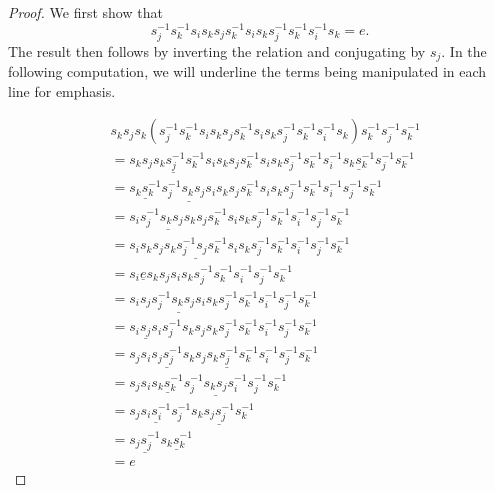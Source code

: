 \documentclass[11pt]{amsart}
\theoremstyle{definition}
\begin{document}
\begin{proof}
We first show that
$$s_{j}^{-1}s_{k}^{-1}s_{i}s_{k}s_{j}s_{k}^{-1}s_{i}s_{k}s_{j}^{-1}s_{k}^{-1}s_{i}^{-1}s_{k} = e.$$
The result then follows by inverting the relation and conjugating by $s_{j}$. In the following computation, we will underline the terms being manipulated in each line for emphasis.

\begin{align*}
& s_{k}s_{j}s_{k}(s_{j}^{-1}s_{k}^{-1}s_{i}s_{k}s_{j}s_{k}^{-1}s_{i}s_{k}s_{j}^{-1}s_{k}^{-1}s_{i}^{-1}s_{k})s_{k}^{-1}s_{j}^{-1}s_{k}^{-1} \\
&= s_{k}\underline{s_{j}s_{k}s_{j}^{-1}s_{k}^{-1}}s_{i}s_{k}s_{j}s_{k}^{-1}s_{i}s_{k}s_{j}^{-1}s_{k}^{-1}s_{i}^{-1}\underline{s_{k}s_{k}^{-1}}s_{j}^{-1}s_{k}^{-1} \\
&= \underline{s_{k}s_{k}^{-1}}\underline{s_{j}^{-1}s_{k}s_{j}s_{i}}s_{k}s_{j}s_{k}^{-1}s_{i}s_{k}s_{j}^{-1}s_{k}^{-1}s_{i}^{-1}s_{j}^{-1}s_{k}^{-1} \\
&= s_{i}\underline{s_{j}^{-1}s_{k}s_{j}s_{k}}s_{j}s_{k}^{-1}s_{i}s_{k}s_{j}^{-1}s_{k}^{-1}s_{i}^{-1}s_{j}^{-1}s_{k}^{-1} \\
&= s_{i}s_{k}s_{j}\underline{s_{k}s_{j}^{-1}s_{j}s_{k}^{-1}}s_{i}s_{k}s_{j}^{-1}s_{k}^{-1}s_{i}^{-1}s_{j}^{-1}s_{k}^{-1} \\
&= s_{i}\underline{e}s_{k}s_{j}s_{i}s_{k}s_{j}^{-1}s_{k}^{-1}s_{i}^{-1}s_{j}^{-1}s_{k}^{-1} \\
&= s_{i}s_{j}\underline{s_{j}^{-1}s_{k}s_{j}s_{i}}s_{k}s_{j}^{-1}s_{k}^{-1}s_{i}^{-1}s_{j}^{-1}s_{k}^{-1} \\
&= \underline{s_{i}s_{j}s_{i}}s_{j}^{-1}s_{k}s_{j}s_{k}s_{j}^{-1}s_{k}^{-1}s_{i}^{-1}s_{j}^{-1}s_{k}^{-1} \\
&= s_{j}s_{i}\underline{s_{j}s_{j}^{-1}}s_{k}\underline{s_{j}s_{k}s_{j}^{-1}s_{k}^{-1}}s_{i}^{-1}s_{j}^{-1}s_{k}^{-1} \\
&= s_{j}s_{i}\underline{s_{k}s_{k}^{-1}}\underline{s_{j}^{-1}s_{k}s_{j}s_{i}^{-1}}s_{j}^{-1}s_{k}^{-1} \\
&= s_{j}\underline{s_{i}s_{i}^{-1}}s_{j}^{-1}s_{k}\underline{s_{j}s_{j}^{-1}}s_{k}^{-1} \\
&= \underline{s_{j}s_{j}^{-1}}\underline{s_{k}s_{k}^{-1}} \\
&= e
\end{align*}
\end{proof}
\end{document}
